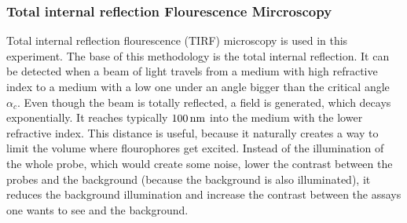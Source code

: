         \subsubsection{Total internal reflection Flourescence Mircroscopy}
            Total internal reflection flourescence (TIRF) microscopy is used in this experiment. The base of this methodology is the total internal reflection. It can be detected when a beam of light travels from a medium with high refractive index to a medium with a low one under an angle bigger than the critical angle $\alpha_c$.
            Even though the beam is totally reflected, a field is generated, which decays exponentially. It reaches typically $\unit[100]{nm}$ into the medium with the lower refractive index.
            This distance is useful, because it naturally creates a way to limit the volume where flourophores get excited. Instead of the illumination of the whole probe, which would create some noise, lower the contrast between the probes and the background (because the background is also illuminated), it reduces the background illumination and increase the contrast between the assays one wants to see and the background.
            